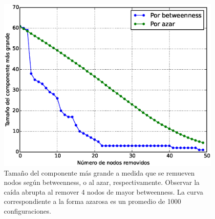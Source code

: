 \begin{figure}
\centering
\includegraphics[scale = 0.60]{figuras/Nodos_removidos} 
\caption{Tamaño del componente más grande a medida que se remueven nodos según betweenness, o al azar, respectivamente. Observar la caída abrupta al remover 4 nodos de mayor betweenness. La curva correspondiente a la forma azarosa es un promedio de 1000 configuraciones.}
\label{fig:Comparacion}
\end{figure}
